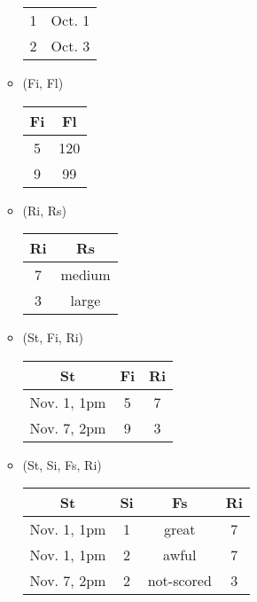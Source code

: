 \documentclass[12pt]{article}
\begin{document}
\begin{enumerate}
\begin{itemize}
\begin{center}
\begin{tabular}{c c}
                    1  & Oct. 1 \\
                    2  & Oct. 3 \\
                    \hline
                  \end{tabular}
                \end{center}
          \item (Fi, Fl)
                \begin{center}
                  \begin{tabular}{c c}
                    \hline
                    Fi & Fl \\
                    \hline
                    5  & 120 \\
                    9  & 99 \\
                    \hline                    
                  \end{tabular}
                \end{center}
          \item (Ri, Rs)
                \begin{center}
                  \begin{tabular}{c c }
                    \hline
                    Ri & Rs \\
                    \hline
                    7  & medium \\
                    3  & large \\
                    \hline
                  \end{tabular}
                \end{center}      
          \item (St, Fi, Ri)
                \begin{center}
                  \begin{tabular}{c c c}
                    \hline
                    St          & Fi & Ri \\
                    \hline
                    Nov. 1, 1pm & 5 & 7 \\
                    Nov. 7, 2pm & 9 & 3 \\
                    \hline
                  \end{tabular}
                \end{center}
          \item (St, Si, Fs, Ri)
                \begin{center}
                  \begin{tabular}{c c c c}
                    \hline
                    St          & Si & Fs         & Ri \\
                    \hline
                    Nov. 1, 1pm & 1  & great      & 7 \\
                    Nov. 1, 1pm & 2  & awful      & 7 \\
                    Nov. 7, 2pm & 2  & not-scored & 3 \\
                    \hline
                  \end{tabular}
                \end{center}
        \end{itemize}


\end{enumerate}
\end{document}
